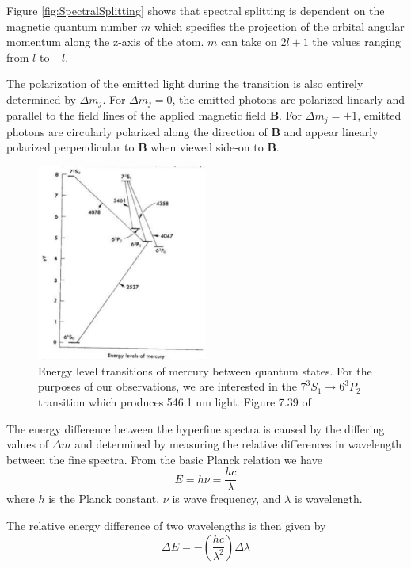 \documentclass[twocolumn]{article}
\begin{document}
		Figure \ref{fig:SpectralSplitting} shows that spectral splitting is dependent on the magnetic quantum number $m$ which specifies the projection of the orbital angular momentum along the z-axis of the atom.
		$m$ can take on $2l+1$ the values ranging from $l$ to $-l$.
		
		The polarization of the emitted light during the transition is also entirely determined by $\Delta m_j$.
		For $\Delta m_j = 0$, the emitted photons are polarized linearly and parallel to the field lines of the applied magnetic field $\mathbf{B}$.
		For $\Delta m_j=\pm1$, emitted photons are circularly polarized along the direction of $\mathbf{B}$ and appear linearly polarized perpendicular to $\mathbf{B}$ when viewed side-on to $\mathbf{B}$.
		\begin{figure}
			\centering
			\includegraphics[width=0.5\textwidth]{Images/MercuryEnergyLevelsDiagram.png}
			\caption{Energy level transitions of mercury between quantum states. For the purposes of our observations, we are interested in the $7^3S_1 \rightarrow 6^3P_2$ transition which produces 546.1 nm light. Figure 7.39 of \cite{melissinos_experiments_1966}}
			\label{fig:MercuryEnergyLevelsDiagram}
		\end{figure}
		
		The energy difference between the hyperfine spectra is caused by the differing values of $\Delta m$ and determined by measuring the relative differences in wavelength between the fine spectra.
		From the basic Planck relation we have
		\begin{equation}
			E = h\nu = \frac{hc}{\lambda}
		\end{equation}
		where $h$ is the Planck constant, $\nu$ is wave frequency, and $\lambda$ is wavelength.
		
		The relative energy difference of two wavelengths is then given by
		\begin{equation}
			\Delta E = -\left(\frac{hc}{\lambda^2}\right) \Delta \lambda
		\end{equation}
		
\end{document}

